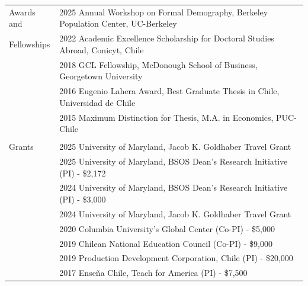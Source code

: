 \documentclass[letterpaper,11pt,oneside]{article}
\begin{document}
\begin{tabular}{@{} l l r}
   \Large{Awards and } & \multicolumn{2}{l}{2025 \hspace{0.1in} Annual Workshop on Formal Demography, Berkeley Population Center, UC-Berkeley}  \\
 \Large{Fellowships} & \multicolumn{2}{l}{2022 \hspace{0.1in} Academic Excellence Scholarship for Doctoral Studies Abroad, Conicyt, Chile}   \\
 & \multicolumn{2}{l}{2018 \hspace{0.1in} GCL Fellowship, McDonough School of Business, Georgetown University}  \\
   & \multicolumn{2}{l}{2016 \hspace{0.1in} Eugenio Lahera Award, Best Graduate Thesis in Chile, Universidad de Chile}\\
     & \multicolumn{2}{l}{2015 \hspace{0.1in} Maximum Distinction for Thesis, M.A. in Economics, PUC-Chile}\\ \\

      \Large{Grants} & \multicolumn{2}{l}{2025 \hspace{0.1in} University of Maryland, Jacob K. Goldhaber Travel Grant } \\
      & \multicolumn{2}{l}{2025 \hspace{0.1in} University of Maryland, BSOS Dean's Research Initiative (PI) - \$2,172} \\
& \multicolumn{2}{l}{2024 \hspace{0.1in} University of Maryland, BSOS Dean's Research Initiative (PI) - \$3,000} \\
 & \multicolumn{2}{l}{2024 \hspace{0.1in} University of Maryland, Jacob K. Goldhaber Travel Grant } \\
 & \multicolumn{2}{l}{2020 \hspace{0.1in} Columbia University's Global Center (Co-PI) - \$5,000} \\
  & \multicolumn{2}{l}{2019 \hspace{0.1in} Chilean National Education Council (Co-PI) - \$9,000 }  \\
   & \multicolumn{2}{l}{2019 \hspace{0.1in} Production Development Corporation, Chile (PI) - \$20,000}\\
  & \multicolumn{2}{l}{2017 \hspace{0.1in} Enseña Chile, Teach for America (PI) - \$7,500}\\ 

\end{tabular}
\end{document}
